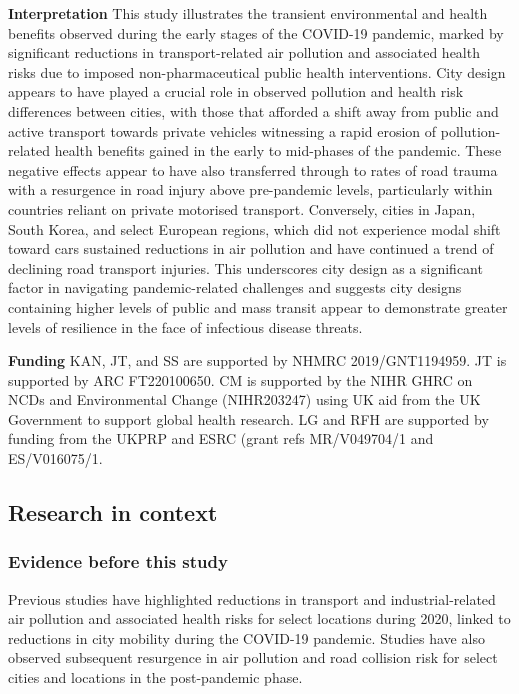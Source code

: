 \documentclass[preprint,10pt]{elsarticle} %
\newcommand{\absdiv}[1]{%
  \par\addvspace{.5\baselineskip}%
  \noindent\textbf{#1}\quad\ignorespaces}
\begin{document}
 \absdiv{\textcolor{OliveGreen}{Interpretation}}
This study illustrates the transient environmental and health benefits observed during the early stages of the COVID-19 pandemic, marked by significant reductions in transport-related air pollution and associated health risks due to imposed non-pharmaceutical public health interventions. City design appears to have played a crucial role in observed pollution and health risk differences between cities, with those that afforded a shift away from public and active transport towards private vehicles witnessing a rapid erosion of pollution-related health benefits gained in the early to mid-phases of the pandemic. These negative effects appear to have also transferred through to rates of road trauma with a resurgence in road injury above pre-pandemic levels, particularly within countries reliant on private motorised transport. Conversely, cities in Japan, South Korea, and select European regions, which did not experience modal shift toward cars sustained reductions in air pollution and have continued a trend of declining road transport injuries. This underscores city design as a significant factor in navigating pandemic-related challenges and suggests city designs containing higher levels of public and mass transit appear to demonstrate greater levels of resilience in the face of infectious disease threats. 
 \absdiv{\textcolor{OliveGreen}{Funding}}
 KAN, JT, and SS are supported by NHMRC 2019/GNT1194959. JT is supported by ARC FT220100650. CM is supported by the NIHR GHRC on NCDs and Environmental Change (NIHR203247) using UK aid from the UK Government to support global health research. LG and RFH are supported by funding from the UKPRP and ESRC (grant refs MR/V049704/1 and ES/V016075/1.


    \subsection*{\textcolor{OliveGreen}{Research in context}}
    \subsubsection*{Evidence before this study}
       Previous studies have highlighted reductions in transport and industrial-related air pollution and associated health risks for select locations during 2020, linked to reductions in city mobility during the COVID-19 pandemic. Studies have also observed subsequent resurgence in air pollution and road collision risk for select cities and locations in the post-pandemic phase. 
\end{document}
